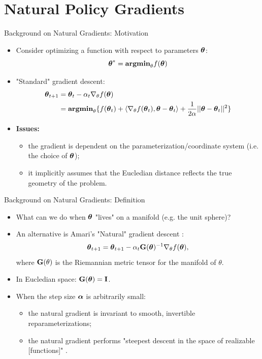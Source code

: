 \documentclass[]{beamer}
\begin{document}
\section{Natural Policy Gradients}

\begin{frame}{Background on Natural Gradients: Motivation}
    \begin{itemize}
        \item Consider optimizing a function with respect to parameters $\mbox{$\mbox{$\boldsymbol{\theta}$}$}$:
        \[ \mbox{$\mbox{$\boldsymbol{\theta}$}$}^* = \mathbf{argmin}_\theta f(\mbox{$\mbox{$\boldsymbol{\theta}$}$}) \]
        \item "Standard" gradient descent:
        \begin{align*}
            \mbox{$\mbox{$\boldsymbol{\theta}$}$}_{t+1} &= \mbox{$\mbox{$\boldsymbol{\theta}$}$}_{t} - \alpha_t \nabla_\theta f(\mbox{$\mbox{$\boldsymbol{\theta}$}$})\\
            &= \mathbf{argmin}_\theta \{ f(\mbox{$\mbox{$\boldsymbol{\theta}$}$}_t) + \langle \nabla_\theta f(\mbox{$\mbox{$\boldsymbol{\theta}$}$}_t), \mbox{$\mbox{$\boldsymbol{\theta}$}$} - \mbox{$\mbox{$\boldsymbol{\theta}$}$}_t \rangle + \frac{1}{2 \alpha}||\mbox{$\mbox{$\boldsymbol{\theta}$}$} - \mbox{$\mbox{$\boldsymbol{\theta}$}$}_t||^2 \}
        \end{align*}
        \item \textbf{Issues:}
        \begin{itemize}
            \item the gradient is dependent on the parameterization/coordinate system (i.e. the choice of $\mbox{$\mbox{$\boldsymbol{\theta}$}$}$);
            \item it implicitly assumes that the Eucledian distance reflects the true geometry of the problem.
        \end{itemize}
    \end{itemize}
\end{frame}

\begin{frame}{Background on Natural Gradients: Definition}

\begin{itemize}
    \item What can we do when $\mbox{$\mbox{$\boldsymbol{\theta}$}$}$ "lives" on a manifold (e.g. the unit sphere)?
    \item An alternative is Amari's "Natural" gradient descent \cite{amari1998natural}:
    \[ \mbox{$\mbox{$\boldsymbol{\theta}$}$}_{t+1} = \mbox{$\mbox{$\boldsymbol{\theta}$}$}_{t+1} - \alpha_t \mbox{$\mbox{$\mathbf{G}$}$}(\mbox{$\mbox{$\boldsymbol{\theta}$}$})^{-1} \nabla_\theta f(\mbox{$\mbox{$\boldsymbol{\theta}$}$}), \]
    where $\mbox{$\mbox{$\mathbf{G}$}$}(\theta)$ is the Riemannian metric tensor for the manifold of $\theta$.
    \item In Eucledian space: $\mbox{$\mbox{$\mathbf{G}$}$}(\mbox{$\mbox{$\boldsymbol{\theta}$}$}) = \mbox{$\mbox{$\mathbf{I}$}$}$.
    \item When the step size $\mbox{$\mbox{$\boldsymbol{\alpha}$}$}$ is arbitrarily small:
    \begin{itemize}
        \item the natural gradient is invariant to smooth, invertible reparameterizations;
        \item the natural gradient performs "steepest descent in the space of realizable [functions]" \cite{martens2014new}.
    \end{itemize}
\end{itemize}
\end{frame}
\end{document}
